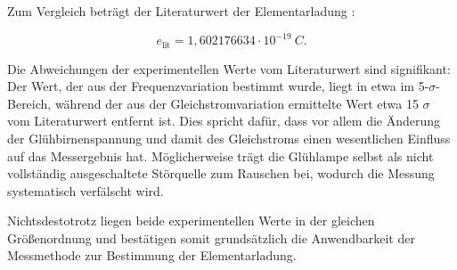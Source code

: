 Zum Vergleich beträgt der Literaturwert der Elementarladung \cite{codata}:

\begin{equation}
    e_{\text{lit}} = 1{,}602176634 \cdot 10^{-19}~\si{C}.
\end{equation}

Die Abweichungen der experimentellen Werte vom Literaturwert sind signifikant: Der Wert, der aus der Frequenzvariation bestimmt wurde, liegt in etwa im 5-\(\sigma\)-Bereich, während der aus der Gleichstromvariation ermittelte Wert etwa 15 \(\sigma\) vom Literaturwert entfernt ist. Dies spricht dafür, dass vor allem die Änderung der Glühbirnenspannung und damit des Gleichstroms einen wesentlichen Einfluss auf das Messergebnis hat. Möglicherweise trägt die Glühlampe selbst als nicht vollständig ausgeschaltete Störquelle zum Rauschen bei, wodurch die Messung systematisch verfälscht wird.

Nichtsdestotrotz liegen beide experimentellen Werte in der gleichen Größenordnung und bestätigen somit grundsätzlich die Anwendbarkeit der Messmethode zur Bestimmung der Elementarladung.